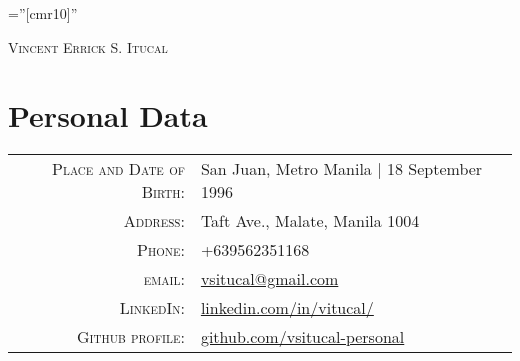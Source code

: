 \documentclass[a4paper,10pt]{article}
\begin{document}

\pagestyle{empty} %

\font\fb=''[cmr10]'' %

	\begin{flushleft}
	{\Large \textsc{Vincent Errick S. Itucal}}
	\end{flushleft}

\section{\normalsize Personal Data}
\begin{tabular}{rl}
    \textsc{\footnotesize Place and Date of Birth:} & \footnotesize San Juan, Metro Manila | 18 September 1996 \\
    \textsc{\footnotesize Address:}         & \footnotesize Taft Ave., Malate, Manila 1004 \\
    \textsc{\footnotesize Phone:}           & \footnotesize +639562351168\\
    \textsc{\footnotesize email:}           & \footnotesize                     \href{mailto:vsitucal@up.edu.ph}{vsitucal@gmail.com}\\
                                            \textsc{\footnotesize LinkedIn}:           
                                            &\footnotesize \href{https://www.linkedin.com/in/vitucal/}{linkedin.com/in/vitucal/}\\
    \textsc{\footnotesize Github profile}:  & \footnotesize \href{https://github.com/vsitucal-personal}{github.com/vsitucal-personal}\\
\end{tabular}

\end{document}
